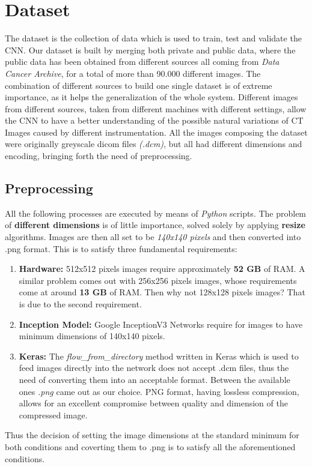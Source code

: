 \documentclass[../main.tex]{subfiles}
\begin{document}
\section{Dataset}
The dataset is the collection of data which is used to train, test and validate the CNN. Our dataset is built by merging both private and public data, where the public data has been obtained from different sources all coming from \textit{Data Cancer Archive}, for a total of more than 90.000 different images.
The combination of different sources to build one single dataset is of extreme importance, as it helps the generalization of the whole system. Different images from different sources, taken from different machines with different settings, allow the CNN to have a better understanding of the possible natural variations of CT Images caused by different instrumentation.
All the images composing the dataset were originally greyscale dicom files \textit{(.dcm)}, but all had different dimensions and encoding, bringing forth the need of preprocessing.
\vspace{5mm}
\subsection{Preprocessing}
All the following processes are executed by means of \textit{Python} scripts. The problem of \textbf{different dimensions} is of little importance, solved solely by applying \textbf{resize} algorithms. Images are then all set to be \textit{140x140 pixels} and then converted into .png format. This is to satisfy three fundamental requirements:
\begin{enumerate}
	\item \textbf{Hardware:} 512x512 pixels images require approximately \textbf{52 GB} of RAM. A similar problem comes out with 256x256 pixels images, whose requirements come at around \textbf{13 GB} of RAM. Then why not 128x128 pixels images? That is due to the second requirement.
	\item \textbf{Inception Model:} Google InceptionV3 Networks require for images to have minimum dimensions of 140x140 pixels.
	\item \textbf{Keras:} The \textit{flow_from_directory} method written in Keras which is used to feed images directly into the network does not accept .dcm files, thus the need of converting them into an acceptable format. Between the available ones \textit{.png} came out as our choice. PNG format, having lossless compression, allows for an excellent compromise between quality and dimension of the compressed image.
\end{enumerate}
Thus the decision of setting the image dimensions at the standard minimum for both conditions and coverting them to .png is to satisfy all the aforementioned conditions.
\end{document}

